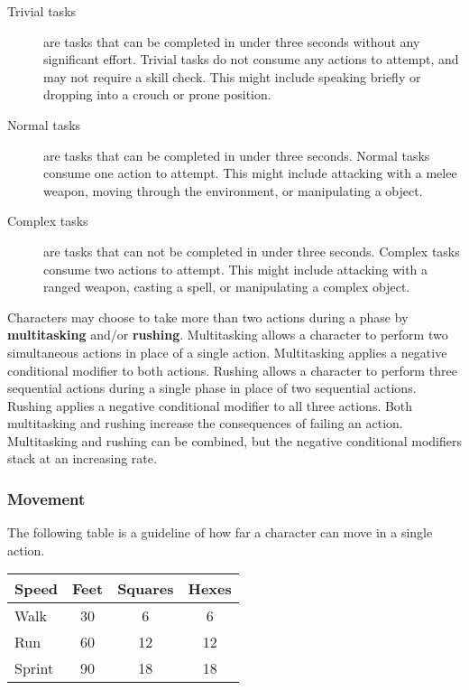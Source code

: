 \documentclass[11pt]{article}
\begin{document}
\begin{description}
	\item[Trivial tasks] are tasks that can be completed in under three seconds without any significant effort.
	Trivial tasks do not consume any actions to attempt, and may not require a skill check.
	This might include speaking briefly or dropping into a crouch or prone position.
	\item[Normal tasks] are tasks that can be completed in under three seconds.
	Normal tasks consume one action to attempt.
	This might include attacking with a melee weapon, moving through the environment, or manipulating a object.
	\item[Complex tasks] are tasks that can not be completed in under three seconds. 
	Complex tasks consume two actions to attempt.
	This might include attacking with a ranged weapon, casting a spell, or manipulating a complex object.
\end{description}

Characters may choose to take more than two actions during a phase by \textbf{multitasking} and/or \textbf{rushing}.
Multitasking allows a character to perform two simultaneous actions in place of a single action.
Multitasking applies a negative conditional modifier to both actions.
Rushing allows a character to perform three sequential actions during a single phase in place of two sequential actions. Rushing applies a negative conditional modifier to all three actions.
Both multitasking and rushing increase the consequences of failing an action.
Multitasking and rushing can be combined, but the negative conditional modifiers stack at an increasing rate.

\subsubsection{Movement}
The following table is a guideline of how far a character can move in a single action.

\begin{center}
	\begin{tabular}{lccc}
		Speed  & Feet & Squares & Hexes \\
		\hline
		Walk   & 30   & 6       & 6     \\
		Run    & 60   & 12      & 12    \\
		Sprint & 90   & 18      & 18    \\
	\end{tabular}
\end{center}
\end{document}
